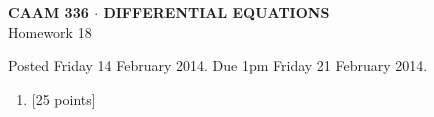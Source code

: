 \documentclass[10pt]{article}
\begin{document}
\vspace*{-5em}
\begin{center}
\large \textsf{\textbf{CAAM 336 $\cdot$ DIFFERENTIAL EQUATIONS}\\[0.5em]
Homework 18 }
\end{center}

Posted Friday 14 February 2014.  Due 1pm Friday 21 February 2014.

\begin{enumerate}\addtocounter{enumi}{17}
\item {[25 points]}  
\end{enumerate}
\end{document}

